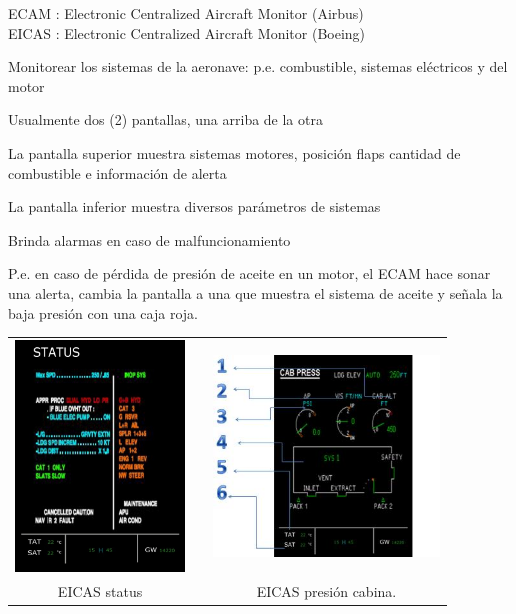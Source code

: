 \begin{frame}

  \begin{block}{ ECAM : Electronic Centralized Aircraft Monitor
    (Airbus) \\
     EICAS : Electronic Centralized Aircraft Monitor (Boeing)}


    Monitorear los sistemas de la aeronave: p.e. combustible, sistemas
    el\'ectricos y del motor

    Usualmente dos (2) pantallas, una arriba de la otra

    La pantalla superior muestra sistemas motores, posici\'on flaps
    cantidad de combustible e informaci\'on de alerta

    La pantalla inferior muestra diversos par\'ametros de sistemas

    Brinda alarmas en caso de malfuncionamiento

    P.e. en caso de p\'erdida de presi\'on de aceite en un motor, el
    ECAM hace sonar una alerta, cambia la pantalla a una que muestra
    el sistema de aceite y se\~nala la baja presi\'on con una caja
    roja.

  \end{block}
    \end{frame}

\begin{frame}
  \begin{tabular}{ccc}
	\includegraphics[width=4.5cm]{imagenes/1.4.pantalla.electronica/eicas_status.jpg}
	& \hspace{3mm} &
\includegraphics[width=6cm]{imagenes/1.4.pantalla.electronica/eicas_presion_cabina.jpg}
	\\
   	EICAS status & 
	& EICAS presi\'on cabina.  
	\\
\end{tabular}

\end{frame}


